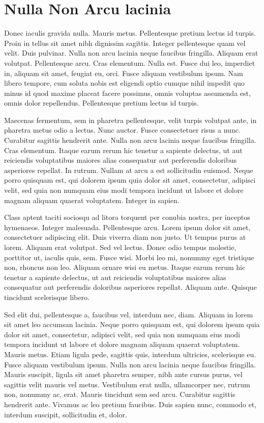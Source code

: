 \documentclass[english,master,dept460,male,cpp,cpdeclaration]{diploma}
\begin{document}
\section{Nulla Non Arcu lacinia}
Donec iaculis gravida nulla. Mauris metus. Pellentesque pretium lectus id turpis. Proin in tellus sit amet nibh dignissim sagittis. Integer pellentesque quam vel velit. Duis pulvinar. Nulla non arcu lacinia neque faucibus fringilla. Aliquam erat volutpat. Pellentesque arcu. Cras elementum. Nulla est. Fusce dui leo, imperdiet in, aliquam sit amet, feugiat eu, orci. Fusce aliquam vestibulum ipsum. Nam libero tempore, cum soluta nobis est eligendi optio cumque nihil impedit quo minus id quod maxime placeat facere possimus, omnis voluptas assumenda est, omnis dolor repellendus. Pellentesque pretium lectus id turpis.

Maecenas fermentum, sem in pharetra pellentesque, velit turpis volutpat ante, in pharetra metus odio a lectus. Nunc auctor. Fusce consectetuer risus a nunc. Curabitur sagittis hendrerit ante. Nulla non arcu lacinia neque faucibus fringilla. Cras elementum. Itaque earum rerum hic tenetur a sapiente delectus, ut aut reiciendis voluptatibus maiores alias consequatur aut perferendis doloribus asperiores repellat. In rutrum. Nullam at arcu a est sollicitudin euismod. Neque porro quisquam est, qui dolorem ipsum quia dolor sit amet, consectetur, adipisci velit, sed quia non numquam eius modi tempora incidunt ut labore et dolore magnam aliquam quaerat voluptatem. Integer in sapien.

Class aptent taciti sociosqu ad litora torquent per conubia nostra, per inceptos hymenaeos. Integer malesuada. Pellentesque arcu. Lorem ipsum dolor sit amet, consectetuer adipiscing elit. Duis viverra diam non justo. Ut tempus purus at lorem. Aliquam erat volutpat. Sed vel lectus. Donec odio tempus molestie, porttitor ut, iaculis quis, sem. Fusce wisi. Morbi leo mi, nonummy eget tristique non, rhoncus non leo. Aliquam ornare wisi eu metus. Itaque earum rerum hic tenetur a sapiente delectus, ut aut reiciendis voluptatibus maiores alias consequatur aut perferendis doloribus asperiores repellat. Aliquam ante. Quisque tincidunt scelerisque libero.

Sed elit dui, pellentesque a, faucibus vel, interdum nec, diam. Aliquam in lorem sit amet leo accumsan lacinia. Neque porro quisquam est, qui dolorem ipsum quia dolor sit amet, consectetur, adipisci velit, sed quia non numquam eius modi tempora incidunt ut labore et dolore magnam aliquam quaerat voluptatem. Mauris metus. Etiam ligula pede, sagittis quis, interdum ultricies, scelerisque eu. Fusce aliquam vestibulum ipsum. Nulla non arcu lacinia neque faucibus fringilla. Mauris suscipit, ligula sit amet pharetra semper, nibh ante cursus purus, vel sagittis velit mauris vel metus. Vestibulum erat nulla, ullamcorper nec, rutrum non, nonummy ac, erat. Mauris tincidunt sem sed arcu. Curabitur sagittis hendrerit ante. Vivamus ac leo pretium faucibus. Duis sapien nunc, commodo et, interdum suscipit, sollicitudin et, dolor.
\end{document}
